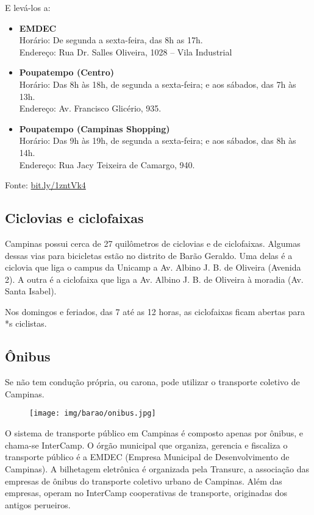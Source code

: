 E levá-los a:
\begin{itemize}
    \item \textbf{EMDEC}
        \\Horário: De segunda a sexta-feira, das 8h as 17h.
        \\Endereço: Rua Dr. Salles Oliveira, 1028 -- Vila Industrial

    \item \textbf{Poupatempo (Centro)}
        \\Horário: Das 8h às 18h, de segunda a sexta-feira;
                    e aos sábados, das 7h às 13h.
        \\Endereço: Av. Francisco Glicério, 935.

    \item \textbf{Poupatempo (Campinas Shopping)}
        \\Horário: Das 9h às 19h, de segunda a sexta-feira;
                    e aos sábados, das 8h às 14h.
        \\Endereço: Rua Jacy Teixeira de Camargo, 940.
\end{itemize}

Fonte:
\url{bit.ly/1zntVk4}

\subsection{Ciclovias e ciclofaixas}

Campinas possui cerca de 27 quilômetros de ciclovias e de ciclofaixas. Algumas
dessas vias para bicicletas estão no distrito de Barão Geraldo. Uma delas é a
ciclovia que liga o campus da Unicamp a Av. Albino J. B. de Oliveira (Avenida 2).
A outra é a ciclofaixa que liga a Av. Albino J. B. de Oliveira à moradia (Av. Santa
Isabel).

Nos domingos e feriados, das 7 até as 12 horas, as ciclofaixas ficam abertas
para *s ciclistas.

\subsection{Ônibus}

Se não tem condução própria, ou carona, pode utilizar o transporte coletivo de
Campinas.

\begin{figure}[h!]  \centering
    \texttt{[image: img/barao/onibus.jpg]}
\end{figure}

O sistema de transporte público em Campinas é composto apenas por ônibus, e
chama-se InterCamp. O órgão municipal que organiza, gerencia e fiscaliza o
transporte público é a EMDEC (Empresa Municipal de Desenvolvimento de Campinas).
A bilhetagem eletrônica é organizada pela Transurc, a associação das empresas de
ônibus do transporte coletivo urbano de Campinas. Além das empresas, operam no
InterCamp cooperativas de transporte, originadas dos antigos perueiros.

